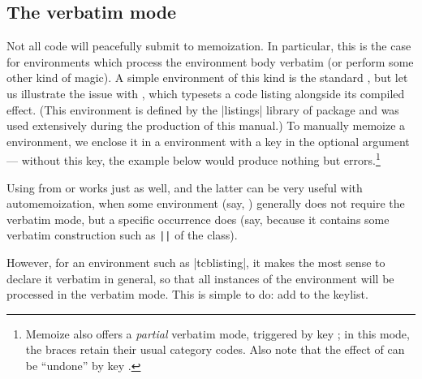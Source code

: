 \documentclass[a4paper,11pt]{article}
\begin{document}
\subsection{The verbatim mode}
\label{sec:tut:verbatim}

Not all code will peacefully submit to memoization.  In particular, this is the
case for environments which process the environment body verbatim (or perform
some other kind of  magic).  A simple environment of this kind is the
standard  , but let us illustrate the issue with
, which typesets a code listing alongside its compiled effect.
(This environment is defined by the |listings| library of package 
and was used extensively during the production of this manual.)  To manually
memoize a  environment, we enclose it in a 
environment with a  key in the optional argument ---
without this key, the example below would produce nothing but
errors.\footnote{Memoize also offers a \emph{partial} verbatim mode, triggered
  by key ; in this mode, the braces retain their usual category
  codes.  Also note that the effect of  can be ``undone'' by
  key .}


Using  from  or  works just as
well, and the latter can be very useful with automemoization, when some
environment (say, ) generally does not require the verbatim mode,
but a specific occurrence does (say, because it contains some verbatim
construction such as \verb!|!\verb!|! of the 
class).

However, for an environment such as |tcblisting|, it makes the most sense to
declare it verbatim in general, so that all instances of the environment will
be processed in the verbatim mode.  This is simple to do: add 
to the  keylist.

\end{document}
